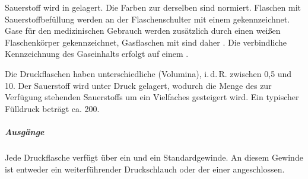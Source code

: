 {%
Sauerstoff wird in
 gelagert.
Die {Farben} zur  derselben sind
normiert.
Flaschen mit Sauerstoffbefüllung werden an der
Flaschenschulter mit einem 
gekennzeichnet.
Gase für den medizinischen Gebrauch werden zusätzlich durch
einen weißen Flaschenkörper gekennzeichnet,
Gasflaschen mit  sind daher
.
\cite{AUT-LAW-VBV2002-1,Igv2010} 
Die verbindliche Kennzeichnung des Gaseinhalts erfolgt auf
einem .

Die Druckflaschen haben unterschiedliche 
(Volumina), i.\,d.\,R. 
zwischen 0,5 und 10\Liter*. 
Der Sauerstoff wird unter Druck gelagert, wodurch
die Menge des zur Verfügung stehenden Sauerstoffs um ein Vielfaches
gesteigert wird. 
Ein typischer Fülldruck beträgt ca. 200\Bar*. 

\subparagraph{Ausgänge}
Jede Druckflasche verfügt über ein  und
ein Standardgewinde. An diesem Gewinde ist entweder ein
weiterführender Druckschlauch oder der 
einer  angeschlossen.
}
